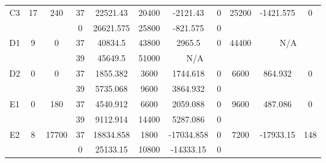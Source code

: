 \begin{sidewaystable}
\begin{tabular}{c||c|c||c|c|c|c|c||c|c|c}
         &
        
      \\
      \hline
      \multirow{2}{*}{C3} &
      \multirow{2}{*}{17} &
      \multirow{2}{*}{240} &
      37 &
      22521.43 &
      20400 &
        -2121.43 &
        0 &
      \multirow{2}{*}{25200} &
        \multirow{2}{*}{-1421.575} &
        \multirow{2}{*}{0}
      \\
      \cline{4-8}
       &
       &
       &
      0 &
      26621.575 &
      25800 &
        -821.575 &
        0 &
      
         &
        
      \\
      \hline
      \multirow{2}{*}{D1} &
      \multirow{2}{*}{9} &
      \multirow{2}{*}{0} &
      37 &
      40834.5 &
      43800 &
        2965.5 &
        0 &
      \multirow{2}{*}{44400} &
        \multicolumn{2}{c}{\multirow{2}{*}{N/A}}
      \\
      \cline{4-8}
       &
       &
       &
      39 &
      45649.5 &
      51000 &
        \multicolumn{2}{|c||}{N/A} &
      
        
      \\
      \hline
      \multirow{2}{*}{D2} &
      \multirow{2}{*}{0} &
      \multirow{2}{*}{0} &
      37 &
      1855.382 &
      3600 &
        1744.618 &
        0 &
      \multirow{2}{*}{6600} &
        \multirow{2}{*}{864.932} &
        \multirow{2}{*}{0}
      \\
      \cline{4-8}
       &
       &
       &
      39 &
      5735.068 &
      9600 &
        3864.932 &
        0 &
      
         &
        
      \\
      \hline
      \multirow{2}{*}{E1} &
      \multirow{2}{*}{0} &
      \multirow{2}{*}{180} &
      37 &
      4540.912 &
      6600 &
        2059.088 &
        0 &
      \multirow{2}{*}{9600} &
        \multirow{2}{*}{487.086} &
        \multirow{2}{*}{0}
      \\
      \cline{4-8}
       &
       &
       &
      39 &
      9112.914 &
      14400 &
        5287.086 &
        0 &
      
         &
        
      \\
      \hline
      \multirow{2}{*}{E2} &
      \multirow{2}{*}{8} &
      \multirow{2}{*}{17700} &
      37 &
      18834.858 &
      1800 &
        -17034.858 &
        0 &
      \multirow{2}{*}{7200} &
        \multirow{2}{*}{-17933.15} &
        \multirow{2}{*}{148}
      \\
      \cline{4-8}
       &
       &
       &
      0 &
      25133.15 &
      10800 &
        -14333.15 &
        0 &
      

\end{tabular}
\end{sidewaystable}
